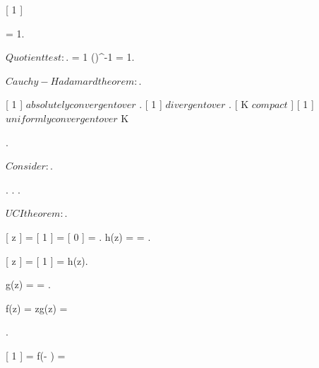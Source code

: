\documentclass[../Main/main]{subfiles}
\begin{document}
{
	{
		\study
		{
			[ 1 ]
		}
		\start
		{
			{
				 = 1.

				$Quotient test:$.
				 = 1 \imp \left(\right)^{-1} = 1. 

				$Cauchy-Hadamard theorem:$.

				[ 1 ] $ absolutely convergent over $ \D.
				[ 1 ] $ divergent  over $ \C \setminus \closed{\D}.
				[ K $ compact $ ]
				{
					[ 1 ] $ uniformly convergent over $  K
				}
				
			}.


			{
				$Consider:$.

				.
				.
				.

				$UCI theorem:$.

				{
					[ z ] =  [ 1 ] = [ 0 ] = .
					h(z) =  = .

					[ z ] = [ 1 ] = h(z).

					g(z) =  = .

					f(z) = zg(z) = 
				}

				
			}.


			{
				[ 1 ] = f(- ) = 
			}
		}
	}
	
}
\end{document}
